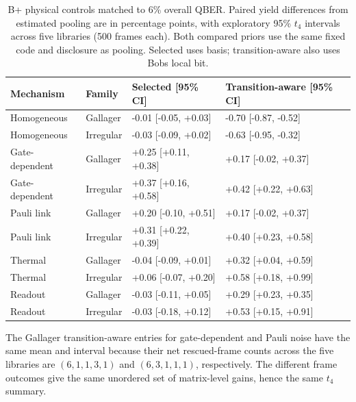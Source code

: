 \begin{table}[!htbp]
\centering
\small\setlength{\tabcolsep}{4pt}
\caption{B+ physical controls matched to 6\% overall QBER. Paired yield differences from estimated pooling are in percentage points, with exploratory 95\% $t_4$ intervals across five libraries (500 frames each). Both compared priors use the same fixed code and disclosure as pooling. Selected uses basis; transition-aware also uses Bob\textquotesingle s local bit.}
\label{tab:physical}
\begin{tabular}{@{}llll@{}}
\toprule
Mechanism & Family & Selected [95\% CI] & Transition-aware [95\% CI] \\
\midrule
Homogeneous & Gallager & -0.01 [-0.05, +0.03] & -0.70 [-0.87, -0.52] \\
Homogeneous & Irregular & -0.03 [-0.09, +0.02] & -0.63 [-0.95, -0.32] \\
Gate-dependent & Gallager & +0.25 [+0.11, +0.38] & +0.17 [-0.02, +0.37] \\
Gate-dependent & Irregular & +0.37 [+0.16, +0.58] & +0.42 [+0.22, +0.63] \\
Pauli link & Gallager & +0.20 [-0.10, +0.51] & +0.17 [-0.02, +0.37] \\
Pauli link & Irregular & +0.31 [+0.22, +0.39] & +0.40 [+0.23, +0.58] \\
Thermal & Gallager & -0.04 [-0.09, +0.01] & +0.32 [+0.04, +0.59] \\
Thermal & Irregular & +0.06 [-0.07, +0.20] & +0.58 [+0.18, +0.99] \\
Readout & Gallager & -0.03 [-0.11, +0.05] & +0.29 [+0.23, +0.35] \\
Readout & Irregular & -0.03 [-0.18, +0.12] & +0.53 [+0.15, +0.91] \\
\bottomrule
\end{tabular}
\end{table}

The Gallager transition-aware entries for gate-dependent and Pauli noise have the
same mean and interval because their net rescued-frame counts across the five
libraries are $(6,1,1,3,1)$ and $(6,3,1,1,1)$, respectively. The different frame
outcomes give the same unordered set of matrix-level gains, hence the same $t_4$
summary.

\FloatBarrier
